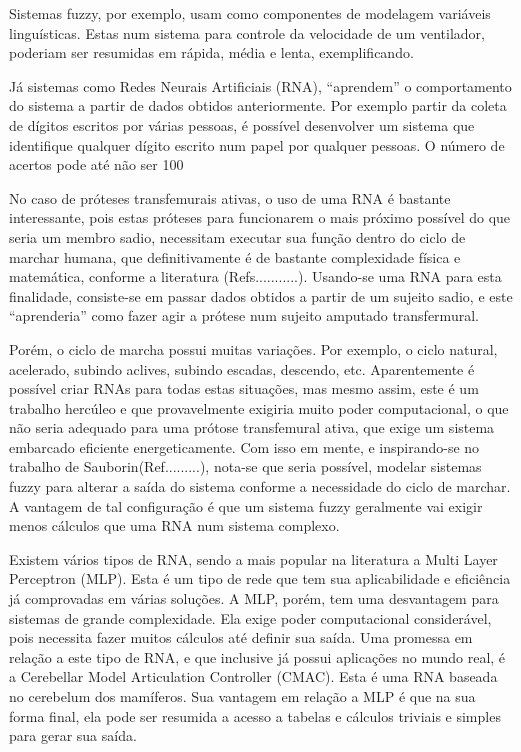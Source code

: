 \documentclass[a4paper, 12pt] {report}
\begin{document}
	Sistemas fuzzy, por exemplo, usam como componentes de modelagem variáveis linguísticas. Estas num sistema para controle da velocidade de um ventilador, poderiam ser resumidas em rápida, média e lenta, exemplificando.

	Já sistemas como Redes Neurais Artificiais (RNA), “aprendem” o comportamento do sistema a partir de dados obtidos anteriormente. Por exemplo partir da coleta de dígitos escritos por várias pessoas, é possível desenvolver um sistema que identifique qualquer dígito escrito num papel por qualquer pessoas. O número de acertos pode até não ser 100%

	No caso de próteses transfemurais ativas, o uso de uma RNA é bastante interessante, pois estas próteses para funcionarem o mais próximo possível do que seria um membro sadio, necessitam executar sua função dentro do ciclo de marchar humana, que definitivamente é de bastante complexidade física e matemática, conforme a literatura (Refs...........). Usando-se uma RNA para esta finalidade, consiste-se em passar dados obtidos a partir de um sujeito sadio, e este “aprenderia” como fazer agir a prótese num sujeito amputado transfermural.

	Porém, o ciclo de marcha possui muitas variações. Por exemplo, o ciclo natural, acelerado, subindo aclives, subindo escadas, descendo, etc. Aparentemente é possível criar RNAs para todas estas situações, mas mesmo assim, este é um trabalho hercúleo e que provavelmente exigiria muito poder computacional, o que não seria adequado para uma prótose transfemural ativa, que exige um sistema embarcado eficiente energeticamente. Com isso em mente, e inspirando-se no trabalho de Sauborin(Ref.........), nota-se que seria possível, modelar sistemas fuzzy para alterar a saída do sistema conforme a necessidade do ciclo de marchar. A vantagem de tal configuração é que um sistema fuzzy geralmente vai exigir menos cálculos que uma RNA num sistema complexo.

	Existem vários tipos de RNA, sendo a mais popular na literatura a Multi Layer Perceptron (MLP). Esta é um tipo de rede que tem sua aplicabilidade e eficiência já comprovadas em várias soluções. A MLP, porém, tem uma desvantagem para sistemas de grande complexidade. Ela exige poder computacional considerável, pois necessita fazer muitos cálculos até definir sua saída. Uma promessa em relação a este tipo de RNA, e que inclusive já possui aplicações no mundo real, é a Cerebellar Model Articulation Controller (CMAC). Esta é uma RNA baseada no cerebelum dos mamíferos. Sua vantagem em relação a MLP é que na sua forma final, ela pode ser resumida a acesso a tabelas e cálculos triviais e simples para gerar sua saída.
\end{document}
